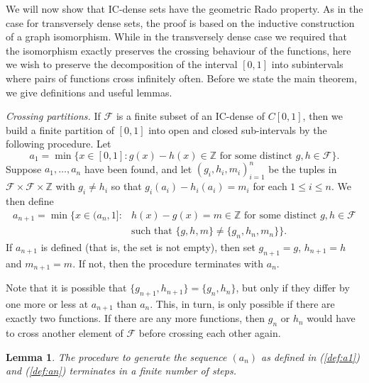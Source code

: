 \documentclass{daj}
\newtheorem{lem}[thm]{Lemma}
\newcommand{\Z}{\mathbb Z}
\begin{document}
We will now show that IC-dense sets have the geometric Rado property.
As in the case for transversely dense sets,
the proof is based on the inductive construction of a graph isomorphism. While in
the transversely dense case we required that the isomorphism exactly preserves the
crossing behaviour of the functions, here we wish to preserve the decomposition of the
interval $[0,1]$ into subintervals where pairs of functions cross infinitely often. Before
we state the main theorem, we give definitions and useful lemmas.

{\sl Crossing partitions.} If $\mathcal{F}$ is a finite subset of an IC-dense of $C[0,1]$, then
we build a finite partition of $[0,1]$ into open and closed
sub-intervals by the following procedure. Let
\begin{equation}\label{def:a1}
a_{1}=\min\{x\in[0,1]\colon g(x)-h(x)\in\Z
\text{ for some distinct }
g,h\in\mathcal F\}.
\end{equation}
Suppose $a_1,\ldots,a_n$ have been found, and let $(g_i,h_i,m_i)_{i=1}^n$ be the tuples
in $\mathcal F\times \mathcal F\times \Z$ with $g_i\ne h_i$ so that
$g_i(a_i)-h_i(a_i)=m_i$ for each $1\leq i\leq n$.
We then define
\begin{equation}
\begin{split}
a_{n+1}=\min\big\{ x\in (a_n,1]\colon &
h(x)-g(x)=m\in\Z
\text{ for some distinct }g,h\in{\mathcal F}\\
&\text{such that }\{g,h,m\}\ne\{g_n,h_n,m_n\}\big\}.
\end{split}
\label{def:an}
\end{equation}
If $a_{n+1}$ is defined (that is, the set is not empty), then set
$g_{n+1}=g$, $h_{n+1}=h$ and $m_{n+1}=m$. If not, then the procedure terminates with $a_n$.

Note that it is possible that $\{g_{n+1},h_{n+1}\}=\{g_n,h_n\}$, but
only if they differ by one more or less at $a_{n+1}$ than $a_{n}$. This, in turn,
is only possible if there are exactly two functions. If there are any more functions, then
$g_n$ or $h_n$ would have to cross another element of $\mathcal F$ before crossing each other
again.

\begin{lem}
The procedure to generate the sequence $(a_n)$ as defined in (\ref{def:a1})
and (\ref{def:an}) terminates in a finite number of steps.
\end{lem}
\end{document}
